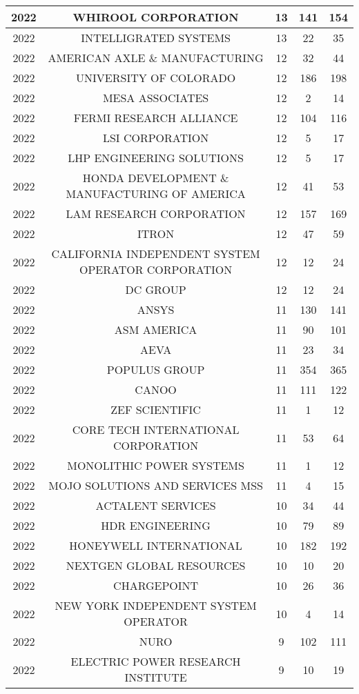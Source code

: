 \documentclass{article}%
\begin{document}
\begin{longtable}{c|c|c|c|c}
\hline%
2022&WHIROOL CORPORATION&13&141&154\\%
\hline%
2022&INTELLIGRATED SYSTEMS&13&22&35\\%
\hline%
2022&AMERICAN AXLE \& MANUFACTURING&12&32&44\\%
\hline%
2022&UNIVERSITY OF COLORADO&12&186&198\\%
\hline%
2022&MESA ASSOCIATES&12&2&14\\%
\hline%
2022&FERMI RESEARCH ALLIANCE&12&104&116\\%
\hline%
2022&LSI CORPORATION&12&5&17\\%
\hline%
2022&LHP ENGINEERING SOLUTIONS&12&5&17\\%
\hline%
2022&HONDA DEVELOPMENT \& MANUFACTURING OF AMERICA&12&41&53\\%
\hline%
2022&LAM RESEARCH CORPORATION&12&157&169\\%
\hline%
2022&ITRON&12&47&59\\%
\hline%
2022&CALIFORNIA INDEPENDENT SYSTEM OPERATOR CORPORATION&12&12&24\\%
\hline%
2022&DC GROUP&12&12&24\\%
\hline%
2022&ANSYS&11&130&141\\%
\hline%
2022&ASM AMERICA&11&90&101\\%
\hline%
2022&AEVA&11&23&34\\%
\hline%
2022&POPULUS GROUP&11&354&365\\%
\hline%
2022&CANOO&11&111&122\\%
\hline%
2022&ZEF SCIENTIFIC&11&1&12\\%
\hline%
2022&CORE TECH INTERNATIONAL CORPORATION&11&53&64\\%
\hline%
2022&MONOLITHIC POWER SYSTEMS&11&1&12\\%
\hline%
2022&MOJO SOLUTIONS AND SERVICES MSS&11&4&15\\%
\hline%
2022&ACTALENT SERVICES&10&34&44\\%
\hline%
2022&HDR ENGINEERING&10&79&89\\%
\hline%
2022&HONEYWELL INTERNATIONAL&10&182&192\\%
\hline%
2022&NEXTGEN GLOBAL RESOURCES&10&10&20\\%
\hline%
2022&CHARGEPOINT&10&26&36\\%
\hline%
2022&NEW YORK INDEPENDENT SYSTEM OPERATOR&10&4&14\\%
\hline%
2022&NURO&9&102&111\\%
\hline%
2022&ELECTRIC POWER RESEARCH INSTITUTE&9&10&19\\%
\hline%

\end{longtable}
\end{document}
